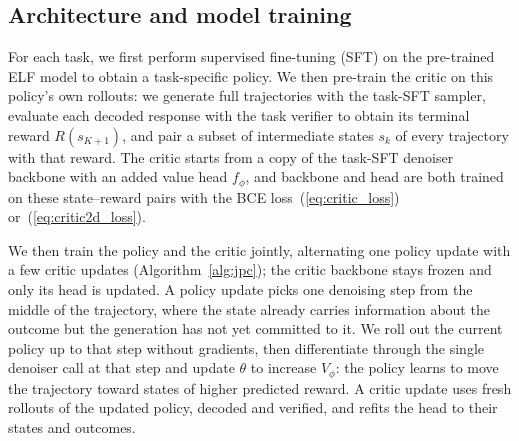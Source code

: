 
\subsection{Architecture and model training}


For each task, we first perform supervised fine-tuning (SFT) on the pre-trained ELF model to obtain a task-specific policy. We then pre-train the critic on this policy's own rollouts: we generate full trajectories with the task-SFT sampler, evaluate each decoded response with the task verifier to obtain its terminal reward $R(s_{K+1})$, and pair a subset of intermediate states $s_k$ of every trajectory with that reward. The critic starts from a copy of the task-SFT denoiser backbone with an added value head $f_\phi$, and backbone and head are both trained on these state--reward pairs with the BCE loss~(\ref{eq:critic_loss}) or~(\ref{eq:critic2d_loss}).

We then train the policy and the critic jointly, alternating one policy update with a few critic updates (Algorithm~\ref{alg:jpc}); the critic backbone stays frozen and only its head is updated. A policy update picks one denoising step from the middle of the trajectory, where the state already carries information about the outcome but the generation has not yet committed to it. We roll out the current policy up to that step without gradients, then differentiate through the single denoiser call at that step and update $\theta$ to increase $V_\phi$: the policy learns to move the trajectory toward states of higher predicted reward. A critic update uses fresh rollouts of the updated policy, decoded and verified, and refits the head to their states and outcomes.

